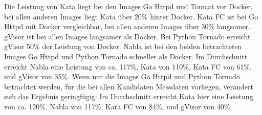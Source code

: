 Die Leistung von Kata liegt bei den Images Go Httpd und Tomcat vor Docker, bei allen anderen Images liegt Kata über 20\% hinter Docker. 
Kata FC ist bei Go Httpd mit Docker vergleichbar, bei allen anderen Images über 30\% langsamer.
gVisor ist bei allen Images langsamer als Docker. Bei Python Tornado erreicht gVisor 50\% der Leistung von Docker.
Nabla ist bei den beiden betrachteten Images Go Httpd und Python Tornado schneller als Docker.
Im Durchschnitt erreicht Nabla eine Leistung von ca. 117\%, Kata von 110\%, Kata FC von 61\%, und gVisor von 35\%.
Wenn nur die Images Go Httpd und Python Tornado betrachtet werden, für die bei allen Kandidaten Messdaten vorliegen, verändert sich das Ergebnis geringfügig: Im Durchschnitt erreicht Kata hier eine Leistung von ca. 120\%, Nabla von 117\%, Kata FC von 84\%, und gVisor von 40\%.

